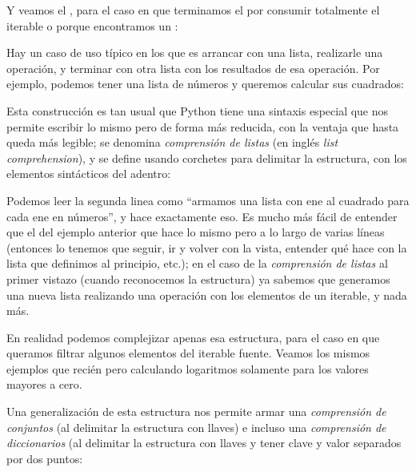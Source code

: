 
Y veamos el , para el caso en que terminamos el  por consumir totalmente el iterable o porque encontramos un :


Hay un caso de uso típico en los  que es arrancar con una lista, realizarle una operación, y terminar con otra lista con los resultados de esa operación. Por ejemplo, podemos tener una lista de números y queremos calcular sus cuadrados:


Esta construcción es tan usual que Python tiene una sintaxis especial que nos permite escribir lo mismo pero de forma más reducida, con la ventaja que hasta queda más legible; se denomina \textit{comprensión de listas} (en inglés \textit{list comprehension}), y se define usando corchetes para delimitar la estructura, con los elementos sintácticos del  adentro:


Podemos leer la segunda linea como ``armamos una lista con ene al cuadrado para cada ene en números'', y hace exactamente eso. Es mucho más fácil de entender que el  del ejemplo anterior que hace lo mismo pero a lo largo de varias líneas (entonces lo tenemos que seguir, ir y volver con la vista, entender qué hace con la lista que definimos al principio, etc.); en el caso de la \textit{comprensión de listas} al primer vistazo (cuando reconocemos la estructura) ya sabemos que generamos una nueva lista realizando una operación con los elementos de un iterable, y nada más.

En realidad podemos complejizar apenas esa estructura, para el caso en que queramos filtrar algunos elementos del iterable fuente. Veamos los mismos ejemplos que recién pero calculando logaritmos solamente para los valores mayores a cero.


Una generalización de esta estructura nos permite armar una \textit{comprensión de conjuntos} (al delimitar la estructura con llaves) e incluso una \textit{comprensión de diccionarios} (al delimitar la estructura con llaves y tener clave y valor separados por dos puntos:



